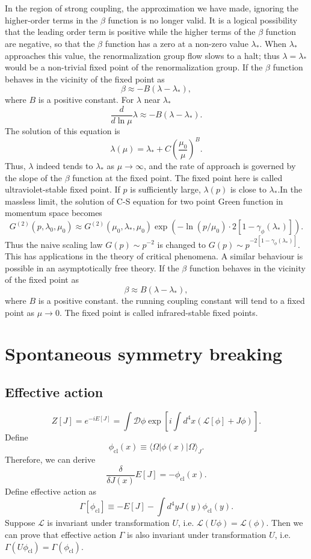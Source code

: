 \\ \\
In the region of strong coupling, the approximation we have made, ignoring the higher-order terms in the $\beta$ function is no longer valid. It is a logical possibility that the leading order term is positive while the higher terms of the $\beta$ function are negative, so that the $\beta$ function has a zero at a non-zero value $\lambda_*$. When $\lambda_*$ approaches this value, the renormalization group flow slows to a halt; thus $\lambda = \lambda_*$ would be a non-trivial fixed point of the renormalization group. 
If the $\beta$ function behaves in the vicinity of the fixed point as 
\[\beta \approx -B(\lambda - \lambda_*),\] 
where $B$ is a positive constant. For $\lambda$ near $\lambda_*$ 
\[\frac{d}{d\ln \mu} \lambda \approx -B(\lambda-\lambda_*).\]
The solution of this equation is
\[\lambda(\mu) = \lambda_* + C(\frac{\mu_0}{\mu})^B.\]
Thus, $\lambda$ indeed tends to $\lambda_*$ as $\mu \to \infty$, and the rate of approach is governed by the slope of the $\beta$ function at the fixed point. The fixed point here is called ultraviolet-stable fixed point. 
If $p$ is sufficiently large, $\lambda(p)$ is close to $\lambda_*$.In the massless limit, the solution of C-S equation for two point Green function in momentum space becomes
\[G^{(2)}(p,\lambda_0,\mu_0) \approx G^{(2)}(\mu_0,\lambda_*,\mu_0)\exp \left (- \ln(p/\mu_0) \cdot 2[1-\gamma_{\phi}(\lambda_*)] \right ).\]
Thus the naive scaling law $G(p) \sim p^{-2}$ is changed to $G(p) \sim p^{-2[1-\gamma_{\phi}(\lambda_*)]}$. This has applications in the theory of critical phenomena.
A similar behaviour is possible in an asymptotically free theory. If the $\beta$ function behaves in the vicinity of the fixed point as 
\[\beta \approx B(\lambda - \lambda_*),\] 
where $B$ is a positive constant.
the running coupling constant will tend to a fixed point as $\mu \to 0$.  The fixed point is called infrared-stable fixed points. 

\section{Spontaneous symmetry breaking}
\subsection{Effective action}
\[Z[J] = e^{-iE[J]} = \int \mathcal{D} \phi \exp\left[ i\int d^4x (\mathcal{L}[\phi] + J \phi) \right].\]
Define 
\[\phi_{\mathrm{cl}} (x) \equiv \langle \Omega | \phi(x) | \Omega \rangle_{J}.\]
Therefore, we can derive
\[\frac{\delta}{\delta J(x)} E[J] = - \phi_{\mathrm{cl}}(x).\]
Define effective action as
\[\Gamma[\phi_{\mathrm{cl}}] \equiv -E[J] - \int d^4y J(y) \phi_{\mathrm{cl}}(y).\]
Suppose $\mathcal{L}$ is invariant under transformation $U$, i.e. $\mathcal{L}(U\phi) = \mathcal{L}(\phi) $. Then we can prove that effective action $\Gamma$ is also invariant under transformation $U$, i.e. $\Gamma(U\phi_{\mathrm{cl}}) = \Gamma(\phi_{\mathrm{cl}}) $.

